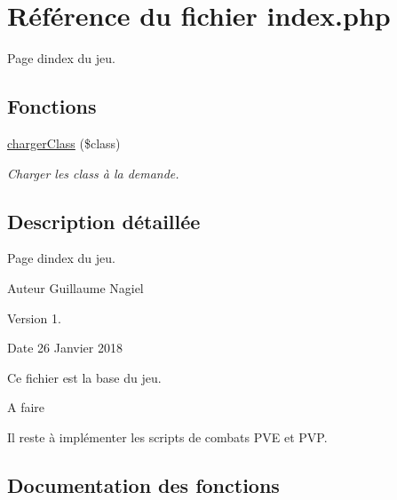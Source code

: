 \hypertarget{index_8php}{}\section{Référence du fichier index.\+php}
\label{index_8php}


Page d\textquotesingle{}index du jeu.  


\subsection*{Fonctions}
\begin{DoxyCompactItemize}
\item 
\mbox{\hyperlink{index_8php_a63a7332e1e0eb5a63a528700d76383a2}{charger\+Class}} (\$class)
\begin{DoxyCompactList}\small\item\em Charger les class à la demande. \end{DoxyCompactList}\end{DoxyCompactItemize}


\subsection{Description détaillée}
Page d\textquotesingle{}index du jeu. 

\begin{DoxyAuthor}{Auteur}
Guillaume Nagiel 
\end{DoxyAuthor}
\begin{DoxyVersion}{Version}
1. 
\end{DoxyVersion}
\begin{DoxyDate}{Date}
26 Janvier 2018
\end{DoxyDate}
Ce fichier est la base du jeu. \begin{DoxyRefDesc}{A faire}
\item[\mbox{\hyperlink{todo__todo000003}{A faire}}]Il reste à implémenter les scripts de combats P\+VE et P\+VP. \end{DoxyRefDesc}


\subsection{Documentation des fonctions}
\mbox{\label{index_8php_a63a7332e1e0eb5a63a528700d76383a2}} 

